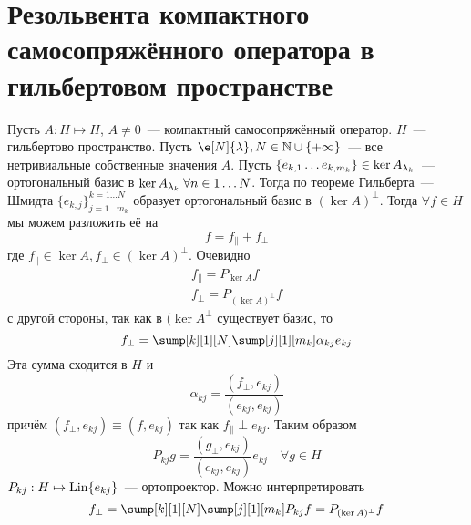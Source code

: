 \documentclass[14pt]{extarticle}
\begin{document}
\section*{Резольвента компактного самосопряжённого оператора в 
гильбертовом пространстве}
Пусть $A : H \mapsto H$, $A \neq 0$~--- компактный самосопряжённый оператор.
$H$~--- гильбертово пространство.
Пусть $\e[N]{\lambda}, N \in \mathbb N \cup \{+\infty\}$~--- все нетривиальные
собственные значения $A$.
Пусть $\{e_{k,1}\dots e_{k,m_k}\} \in \ker \Al[k]$~--- ортогональный базис в 
$\ker \Al[k]\; \forall n \in 1\dots N$.
Тогда по теореме Гильберта~--- Шмидта $\{e_{k,j}\}_{j = 1\dots m_k}^{k = 1 \dots N}$
образует ортогональный базис в $(\ker A)^\perp$.
Тогда $\forall f \in H$ мы можем разложить её на
$$
f = f_\parallel + f_\perp
$$
где $f_\parallel \in \ker A, f_\perp \in (\ker A)^\perp$.
Очевидно
\begin{gather*}
    f_\parallel = P_{\ker A}f\\
    f_\perp = P_{(\ker A)^\perp} f
\end{gather*}
с другой стороны, так как в  $(\ker A^\perp$ существует базис, то
$$
f_\perp = \sump[k][1][N] \sump[j][1][m_k] \alpha_{kj} e_{kj}
$$
Эта сумма сходится в $H$ и 
$$
\alpha_{kj} = \dfrac{(f_\perp, e_{kj})}{(e_{kj}, e_{kj})}
$$
причём $(f_\perp, e_{kj}) \equiv (f, e_{kj})$ так как $f_\parallel \perp e_{kj}$.
Таким образом
$$
P_{kj}g = \dfrac{(g_\perp, e_{kj})}{(e_{kj}, e_{kj})} e_{kj} \quad \forall g \in H
$$
$P_{kj} : H \mapsto \operatorname{Lin}\{e_{kj}\}$~--- ортопроектор.
Можно интерпретировать
$$
f_\perp = \sump[k][1][N] \sump[j][1][m_k] P_{kj} f = P_{(\ker A)^\perp}f 
$$
\end{document}
